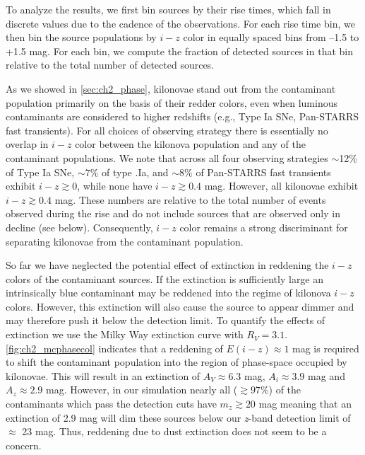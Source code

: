 To analyze the results, we first bin sources by their rise times, which fall in discrete values due to the cadence of the observations. For each rise time bin, we then bin the source populations by $i-z$ color in equally spaced bins from --1.5 to +1.5 mag. For each bin, we compute the fraction of detected sources in that bin relative to the total number of detected sources.

As we showed in \autoref{sec:ch2_phase}, kilonovae stand out from the contaminant population primarily on the basis of their redder colors, even when luminous contaminants are considered to higher redshifts (e.g., Type Ia SNe, Pan-STARRS fast transients). For all choices of observing strategy there is essentially no overlap in $i-z$ color between the kilonova population and any of the contaminant populations. We note that across all four observing strategies $\sim$12\% of Type Ia SNe, $\sim7\%$ of type .Ia, and $\sim8\%$ of Pan-STARRS fast transients exhibit $i-z\gtrsim 0$, while none have $i-z\gtrsim0.4$ mag. However, all kilonovae exhibit $i-z\gtrsim0.4$ mag. These numbers are relative to the total number of events observed during the rise and do not include sources that are observed only in decline (see below). Consequently, $i-z$ color remains a strong discriminant for separating kilonovae from the contaminant population.

So far we have neglected the potential effect of extinction in reddening the $i-z$ colors of the contaminant sources. If the extinction is sufficiently large an intrinsically blue contaminant may be reddened into the regime of kilonova $i-z$ colors. However, this extinction will also cause the source to appear dimmer and may therefore push it below the detection limit. To quantify the effects of extinction we use the Milky Way extinction curve with $R_V = 3.1$. \autoref{fig:ch2_mcphasecol} indicates that a reddening of $E(i-z) \approx 1$ mag is required to shift the contaminant population into the region of phase-space occupied by kilonovae. This will result in an extinction of $A_V \approx 6.3$ mag, $A_i \approx 3.9$ mag and $A_z \approx 2.9$ mag.  However, in our simulation nearly all ($\gtrsim 97\%$) of the contaminants which pass the detection cuts have $m_z \gtrsim 20$ mag meaning that an extinction of 2.9 mag will dim these sources below our {\em z}-band detection limit of $\approx$ 23 mag. Thus, reddening due to dust extinction does not seem to be a concern.

